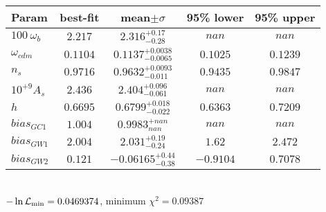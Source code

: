 \begin{tabular}{|l|c|c|c|c|} 
 \hline 
Param & best-fit & mean$\pm\sigma$ & 95\% lower & 95\% upper \\ \hline 
$100~\omega_{b }$ &$2.217$ & $2.316_{-0.28}^{+0.17}$ & $nan$ & $nan$ \\ 
$\omega_{cdm }$ &$0.1104$ & $0.1137_{-0.0065}^{+0.0038}$ & $0.1025$ & $0.1239$ \\ 
$n_{s }$ &$0.9716$ & $0.9632_{-0.011}^{+0.0093}$ & $0.9435$ & $0.9847$ \\ 
$10^{+9}A_{s }$ &$2.436$ & $2.404_{-0.061}^{+0.096}$ & $nan$ & $nan$ \\ 
$h$ &$0.6695$ & $0.6799_{-0.022}^{+0.018}$ & $0.6363$ & $0.7209$ \\ 
$bias_{GC 1 }$ &$1.004$ & $0.9983_{nan}^{+nan}$ & $nan$ & $nan$ \\ 
$bias_{GW 1 }$ &$2.004$ & $2.031_{-0.24}^{+0.19}$ & $1.62$ & $2.472$ \\ 
$bias_{GW 2 }$ &$0.121$ & $-0.06165_{-0.38}^{+0.44}$ & $-0.9104$ & $0.7078$ \\ 
\hline 
 \end{tabular} \\ 
$-\ln{\cal L}_\mathrm{min} =0.0469374$, minimum $\chi^2=0.09387$ \\ 
